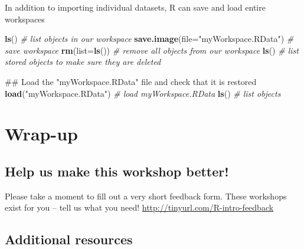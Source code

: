 \documentclass[]{book}
\newenvironment{Shaded}{\begin{snugshade}}{\end{snugshade}}
\newcommand{\KeywordTok}[1]{\textcolor[rgb]{0.13,0.29,0.53}{\textbf{#1}}}
\newcommand{\DataTypeTok}[1]{\textcolor[rgb]{0.13,0.29,0.53}{#1}}
\newcommand{\StringTok}[1]{\textcolor[rgb]{0.31,0.60,0.02}{#1}}
\newcommand{\CommentTok}[1]{\textcolor[rgb]{0.56,0.35,0.01}{\textit{#1}}}
\newcommand{\NormalTok}[1]{#1}
\begin{document}
In addition to importing individual datasets, R can save and load entire
workspaces

\begin{Shaded}
\begin{Highlighting}[]
\KeywordTok{ls}\NormalTok{() }\CommentTok{# list objects in our workspace}
\KeywordTok{save.image}\NormalTok{(}\DataTypeTok{file=}\StringTok{"myWorkspace.RData"}\NormalTok{) }\CommentTok{# save workspace }
\KeywordTok{rm}\NormalTok{(}\DataTypeTok{list=}\KeywordTok{ls}\NormalTok{()) }\CommentTok{# remove all objects from our workspace }
\KeywordTok{ls}\NormalTok{() }\CommentTok{# list stored objects to make sure they are deleted}
\end{Highlighting}
\end{Shaded}

\begin{Shaded}
\begin{Highlighting}[]
\NormalTok{## Load the "myWorkspace.RData" file and check that it is restored}
\KeywordTok{load}\NormalTok{(}\StringTok{"myWorkspace.RData"}\NormalTok{) }\CommentTok{# load myWorkspace.RData}
\KeywordTok{ls}\NormalTok{() }\CommentTok{# list objects}
\end{Highlighting}
\end{Shaded}

\chapter{Wrap-up}\label{wrap-up}

\section{Help us make this workshop
better!}\label{help-us-make-this-workshop-better}

Please take a moment to fill out a very short feedback form. These
workshops exist for you -- tell us what you need!
\url{http://tinyurl.com/R-intro-feedback}

\section{Additional resources}\label{additional-resources}
\end{document}

